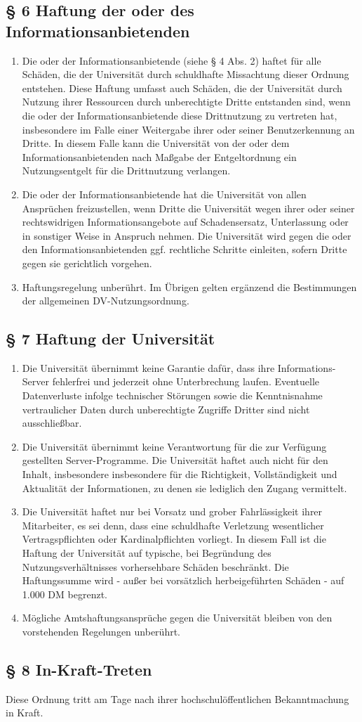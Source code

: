 \subsection*{
§ 6
Haftung der oder des Informationsanbietenden}
\begin{enumerate}
\item Die oder der Informationsanbietende (siehe § 4 Abs. 2) haftet für alle Schäden, die der Universität durch schuldhafte Missachtung dieser Ordnung entstehen. Diese Haftung umfasst auch Schäden, die der Universität durch Nutzung ihrer Ressourcen durch unberechtigte Dritte entstanden sind, wenn die oder der Informationsanbietende diese Drittnutzung zu vertreten hat, insbesondere im Falle einer Weitergabe ihrer oder seiner Benutzerkennung an Dritte. In diesem Falle kann die Universität von der oder dem Informationsanbietenden nach Maßgabe der Entgeltordnung ein Nutzungsentgelt für die Drittnutzung verlangen.
\item Die oder der Informationsanbietende hat die Universität von allen Ansprüchen freizustellen, wenn Dritte die Universität wegen ihrer oder seiner rechtswidrigen Informationsangebote auf Schadensersatz, Unterlassung oder in sonstiger Weise in Anspruch nehmen. Die Universität wird gegen die oder den Informationsanbietenden ggf. rechtliche Schritte einleiten, sofern Dritte gegen sie gerichtlich vorgehen.
\item Haftungsregelung unberührt. Im Übrigen gelten ergänzend die Bestimmungen der allgemeinen DV-Nutzungsordnung.
\end{enumerate}
\subsection*{§ 7 Haftung der Universität}
\begin{enumerate}
\item Die Universität übernimmt keine Garantie dafür, dass ihre Informations-Server fehlerfrei und jederzeit ohne Unterbrechung laufen. Eventuelle Datenverluste infolge technischer Störungen sowie die Kenntnisnahme vertraulicher Daten durch unberechtigte Zugriffe Dritter sind nicht ausschließbar.
\item Die Universität übernimmt keine Verantwortung für die zur
  Verfügung gestellten Server-Programme.
Die Universität haftet auch nicht für den Inhalt, insbesondere
insbesondere für die Richtigkeit, Vollständigkeit und Aktualität der
Informationen, zu denen sie lediglich den Zugang vermittelt.
\item  Die Universität haftet nur bei Vorsatz und grober
  Fahrlässigkeit ihrer Mitarbeiter, es sei denn, dass eine schuldhafte
  Verletzung wesentlicher Vertragspflichten oder Kardinalpflichten
  vorliegt. In diesem Fall ist die Haftung der Universität auf
  typische, bei Begründung des Nutzungsverhältnisses vorhersehbare
  Schäden beschränkt. Die Haftungssumme wird - außer bei vorsätzlich
  herbeigeführten Schäden - auf 1.000 DM begrenzt.
\item Mögliche Amtshaftungsansprüche gegen die Universität bleiben von den vorstehenden Regelungen unberührt.
\end{enumerate}
\subsection*{§ 8
In-Kraft-Treten}

Diese Ordnung tritt am Tage nach ihrer hochschulöffentlichen Bekanntmachung in Kraft.


